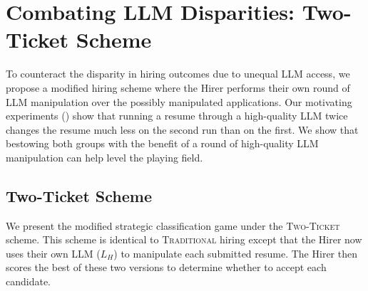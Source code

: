 \section{Combating LLM Disparities: Two-Ticket Scheme}
\label{sec: two-ticket scheme}

    To counteract the disparity in hiring outcomes due to unequal LLM access, we propose a modified hiring scheme where the Hirer performs their own round of LLM manipulation over the possibly manipulated applications. Our motivating experiments () show that running a resume through a high-quality LLM twice changes the resume much less on the second run than on the first. We show that bestowing both groups with the benefit of a round of high-quality LLM manipulation can help level the playing field.

    \subsection{Two-Ticket Scheme}
        We present the modified strategic classification game under the \textsc{Two-Ticket} scheme. This scheme is identical to \textsc{Traditional} hiring except that the Hirer now uses their own LLM (\(L_H\)) to manipulate each submitted resume. The Hirer then scores the best of these two versions to determine whether to accept each candidate.
        
